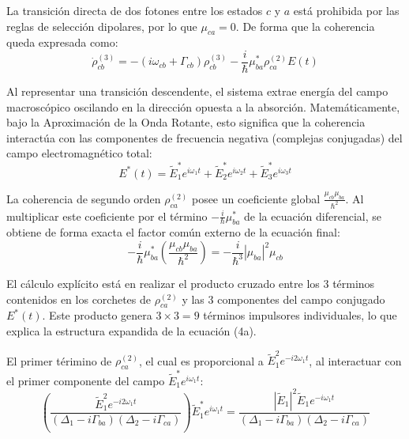 \documentclass[12pt,a4paper]{article}
\begin{document}
La transición directa de dos fotones entre los estados $c$ y $a$ está prohibida por las reglas de selección dipolares, por lo que $\mu_{ca} = 0$. De forma que la coherencia queda expresada como:
\begin{equation}
\dot{\rho}_{cb}^{(3)} = -(i\omega_{cb} + \Gamma_{cb})\rho_{cb}^{(3)} - \frac{i}{\hbar} \mu_{ba}^* \rho_{ca}^{(2)} E(t)
\end{equation}

Al representar una transición descendente, el sistema extrae energía del campo macroscópico oscilando en la dirección opuesta a la absorción. Matemáticamente, bajo la Aproximación de la Onda Rotante, esto significa que la coherencia interactúa con las componentes de frecuencia negativa (complejas conjugadas) del campo electromagnético total:
\begin{equation}
E^*(t) = \tilde{E}_1^* e^{i\omega_1 t} + \tilde{E}_2^* e^{i\omega_2 t} + \tilde{E}_3^* e^{i\omega_3 t}
\end{equation}

La coherencia de segundo orden $\rho_{ca}^{(2)}$ posee un coeficiente global $\frac{\mu_{cb}\mu_{ba}}{\hbar^2}$. Al multiplicar este coeficiente por el término $-\frac{i}{\hbar}\mu_{ba}^*$ de la ecuación diferencial, se obtiene de forma exacta el factor común externo de la ecuación final:
\begin{equation}
-\frac{i}{\hbar} \mu_{ba}^* \left( \frac{\mu_{cb}\mu_{ba}}{\hbar^2} \right) = -\frac{i}{\hbar^3} |\mu_{ba}|^2 \mu_{cb}
\end{equation}

El cálculo explícito está en realizar el producto cruzado entre los $3$ términos contenidos en los corchetes de $\rho_{ca}^{(2)}$ y las $3$ componentes del campo conjugado $E^*(t)$. Este producto genera $3 \times 3 = 9$ términos impulsores individuales, lo que explica la estructura expandida de la ecuación (4a).

El primer térimino de $\rho_{ca}^{(2)}$, el cual es proporcional a $\tilde{E}_1^2 e^{-i2\omega_1 t}$, al interactuar con el primer componente del campo $\tilde{E}_1^* e^{i\omega_1 t}$:
\begin{equation}
\left( \frac{\tilde{E}_1^2 e^{-i2\omega_1 t}}{(\Delta_1 - i\Gamma_{ba})(\Delta_2 - i\Gamma_{ca})} \right) \tilde{E}_1^* e^{i\omega_1 t} = \frac{|\tilde{E}_1|^2 \tilde{E}_1 e^{-i\omega_1 t}}{(\Delta_1 - i\Gamma_{ba})(\Delta_2 - i\Gamma_{ca})}
\end{equation}
\end{document}
